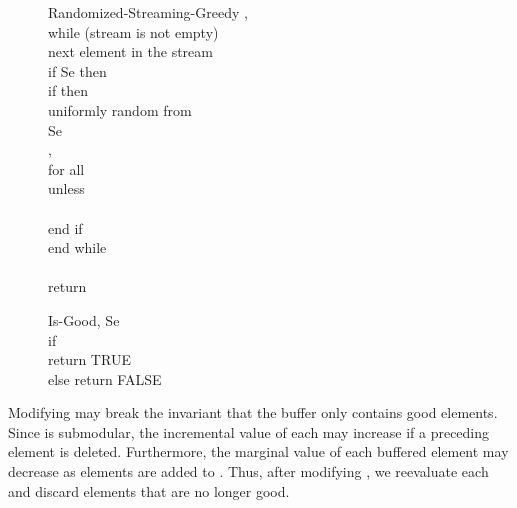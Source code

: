 \documentclass[oneside,letterpaper]{scrartcl} \usepackage{macros}
\begin{document}
\begin{figure}
\centering
  \begin{minipage}{6.9cm}
    \begin{framed}
      \begin{pseudocode}
        \begin{routine}{Randomized-Streaming-Greedy}
          ,  \\ while (stream is not empty) \\
          \>  next element in the stream\\
          \> if Se then  \\
          \> if  then \+ \\
          \>  uniformly random from  \\
          \> Se \\\> ,  \\
          \> for all  \\
          \> \> unless \\
          \> \> \> \\
          end if \\
          \< end while \- \\
          \buffer \\
          return 
        \end{routine}
      \end{pseudocode}
    \end{framed}
  \end{minipage}
\qquad
  \begin{minipage}{6.8cm}
    \begin{framed}
      \begin{pseudocode}
        \begin{routine}{Is-Good}{,}
          Se\\
          if  \\
          \> return TRUE\\
          else return FALSE
        \end{routine}
      \end{pseudocode}
    \end{framed}
  \end{minipage}
\end{figure}




Modifying  may break the invariant that the buffer only contains
good elements. Since  is submodular, the incremental value
 of each  may increase if a preceding
element is deleted. Furthermore, the marginal value  of each
buffered element  may decrease as elements are added to
. Thus, after modifying , we reevaluate each  and
discard elements that are no longer good.
\end{document}
